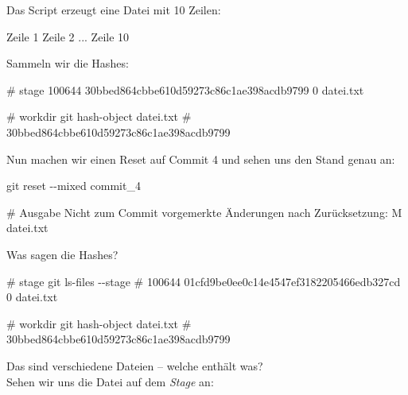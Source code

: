 \documentclass[
  ngerman,
  letterpaper,
  DIV=11]{scrreprt}
\newenvironment{Shaded}{\begin{snugshade}}{\end{snugshade}}
\newcommand{\AttributeTok}[1]{\textcolor[rgb]{0.40,0.45,0.13}{#1}}
\newcommand{\CommentTok}[1]{\textcolor[rgb]{0.37,0.37,0.37}{#1}}
\newcommand{\ExtensionTok}[1]{\textcolor[rgb]{0.00,0.23,0.31}{#1}}
\newcommand{\FunctionTok}[1]{\textcolor[rgb]{0.28,0.35,0.67}{#1}}
\newcommand{\NormalTok}[1]{\textcolor[rgb]{0.00,0.23,0.31}{#1}}
\newcommand{\stage}{\textit{Stage}\xspace}
\begin{document}
Das Script erzeugt eine Datei mit 10 Zeilen:

\begin{Shaded}
\begin{Highlighting}[]
\ExtensionTok{Zeile}\NormalTok{ 1}
\ExtensionTok{Zeile}\NormalTok{ 2}
\ExtensionTok{...}
\ExtensionTok{Zeile}\NormalTok{ 10}
\end{Highlighting}
\end{Shaded}

Sammeln wir die Hashes:

\begin{Shaded}
\begin{Highlighting}[]
\CommentTok{\# stage}
\ExtensionTok{100644}\NormalTok{ 30bbed864cbbe610d59273c86c1ae398acdb9799 0   datei.txt}

\CommentTok{\# workdir }
\FunctionTok{git}\NormalTok{ hash{-}object datei.txt}
\CommentTok{\# 30bbed864cbbe610d59273c86c1ae398acdb9799}
\end{Highlighting}
\end{Shaded}

Nun machen wir einen Reset auf Commit 4 und sehen uns den Stand genau
an:

\begin{Shaded}
\begin{Highlighting}[]
\FunctionTok{git}\NormalTok{ reset }\AttributeTok{{-}{-}mixed}\NormalTok{ commit\_4}

\CommentTok{\# Ausgabe}
\ExtensionTok{Nicht}\NormalTok{ zum Commit vorgemerkte Änderungen nach Zurücksetzung:}
\ExtensionTok{M}\NormalTok{        datei.txt}
\end{Highlighting}
\end{Shaded}

Was sagen die Hashes?

\begin{Shaded}
\begin{Highlighting}[]
\CommentTok{\# stage}
\FunctionTok{git}\NormalTok{ ls{-}files }\AttributeTok{{-}{-}stage}
\CommentTok{\# 100644 01cfd9be0ee0c14e4547ef3182205466edb327cd 0 datei.txt}

\CommentTok{\# workdir }
\FunctionTok{git}\NormalTok{ hash{-}object datei.txt}
\CommentTok{\# 30bbed864cbbe610d59273c86c1ae398acdb9799}
\end{Highlighting}
\end{Shaded}

Das sind verschiedene Dateien -- welche enthält was?\\
Sehen wir uns die Datei auf dem \stage an:
\end{document}
